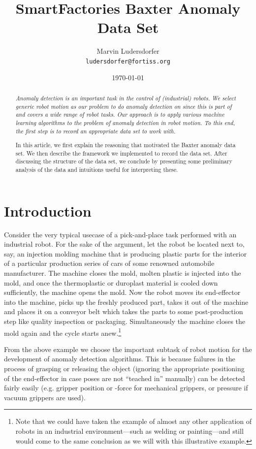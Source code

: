 \documentclass{scrartcl}
\title{SmartFactories Baxter Anomaly Data Set}
\author{Marvin Ludersdorfer\\\texttt{ludersdorfer@fortiss.org}}
\date{\today}
\begin{document}
\maketitle

\begin{abstract}
    \em
    Anomaly detection is an important task in the control of (industrial) robots.
    We select generic robot motion as our problem to do anomaly detection on since this is part of and covers a wide range of robot tasks.
    Our approach is to apply various machine learning algorithms to the problem of anomaly detection in robot motion.
    To this end, the first step is to record an appropriate data set to work with.
    
    In this article, we first explain the reasoning that motivated the Baxter anomaly data set.
    We then describe the framework we implemented to record the data set.
    After discussing the structure of the data set, we conclude by presenting some preliminary analysis of the data and intuitions useful for interpreting these.
\end{abstract}

\tableofcontents

\section{Introduction}
    Consider the very typical usecase of a pick-and-place task performed with an industrial robot.
    For the sake of the argument, let the robot be located next to, say, an injection molding machine that is producing plastic parts for the interior of a particular production series of cars of some renowned automobile manufacturer.
    The machine closes the mold, molten plastic is injected into the mold, and once the thermoplastic or duroplast material is cooled down sufficiently, the machine opens the mold.
    Now the robot moves its end-effector into the machine, picks up the freshly produced part, takes it out of the machine and places it on a conveyor belt which takes the parts to some post-production step like quality inspection or packaging.
    Simultaneously the machine closes the mold again and the cycle starts anew.\footnote{Note that we could have taken the example of almost any other application of robots in an industrial environment---such as welding or painting---and still would come to the same conclusion as we will with this illustrative example.}
    
    From the above example we choose the important subtask of robot motion for the development of anomaly detection algorithms.
    This is because failures in the process of grasping or releasing the object (ignoring the appropriate positioning of the end-effector in case poses are not ``teached in'' manually) can be detected fairly easily (e.g. gripper position or -force for mechanical grippers, or pressure if vacuum grippers are used).
\end{document}
